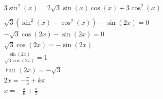 \documentclass[preview,convert={density=300,outext=.png}]{standalone}
\begin{document}
\begin{align*}
    & 3\sin^2(x) = 2\sqrt{3}\sin(x)\cos(x) + 3\cos^2(x) \\
    & \\
    & \sqrt{3}(\sin^2(x) - \cos^2(x)) - \sin(2x) = 0 \\
    & -\sqrt{3}\cos(2x) - \sin(2x) = 0 \\
    & \sqrt{3}\cos(2x) = -\sin(2x) \\
    & \frac{\sin(2x)}{\sqrt{3}\cos(2x)} = 1 \\
    & \tan(2x) = -\sqrt{3} \\
    & 2x = -\frac{\pi}{3} + k\pi \\
    & x = -\frac{\pi}{6} + \frac{\pi}{2} \\
\end{align*}
\end{document}
